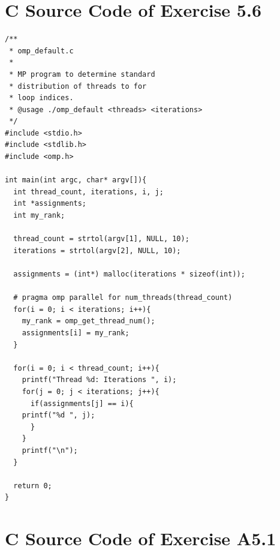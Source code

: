 \documentclass[a4paper,11pt,twoside]{article}
\begin{document}
\section{C Source Code of Exercise 5.6}{\label{app:default}}
\begin{verbatim}
/**
 * omp_default.c
 * 
 * MP program to determine standard 
 * distribution of threads to for
 * loop indices.
 * @usage ./omp_default <threads> <iterations> 
 */
#include <stdio.h>
#include <stdlib.h>
#include <omp.h>

int main(int argc, char* argv[]){
  int thread_count, iterations, i, j;
  int *assignments;
  int my_rank;

  thread_count = strtol(argv[1], NULL, 10);
  iterations = strtol(argv[2], NULL, 10);

  assignments = (int*) malloc(iterations * sizeof(int));

  # pragma omp parallel for num_threads(thread_count)
  for(i = 0; i < iterations; i++){
    my_rank = omp_get_thread_num();
    assignments[i] = my_rank;
  }

  for(i = 0; i < thread_count; i++){
    printf("Thread %d: Iterations ", i);
    for(j = 0; j < iterations; j++){
      if(assignments[j] == i){
	printf("%d ", j);
      }
    }
    printf("\n");
  }

  return 0;
}

\end{verbatim}

\section{C Source Code of Exercise A5.1}{\label{app:histo}}
\end{document}

